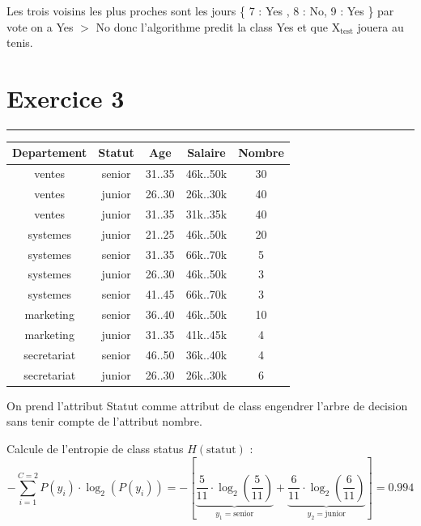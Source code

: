 \documentclass{article}
\newcommand{\exer}[1]{
  \section*{Exercice #1}
  \vspace{-0.5cm}
  \noindent\rule{\textwidth}{0.5pt}%
}
\begin{document}
Les trois voisins les plus proches sont les jours  \{ 7 : Yes , 8 : No, 9 : Yes \} par vote 
on a Yes $>$ No donc l'algorithme predit la class Yes et que X$_{\text{test}}$ jouera au tenis.


\newpage

\exer{3}

\vspace{0.25cm}

\begin{table}[h]
\centering

\renewcommand{\arraystretch}{1.75} 
\setlength{\tabcolsep}{12pt}      

\begin{tabular}{|c|c|c|c|c|} 

\hline

Departement & Statut & Age & Salaire & Nombre \\ \hline
ventes & senior & 31..35 & 46k..50k  & 30\\ \hline
ventes & junior & 26..30 & 26k..30k & 40 \\ \hline
ventes & junior & 31..35 & 31k..35k & 40 \\ \hline
systemes & junior & 21..25 & 46k..50k & 20 \\ \hline
systemes & senior & 31..35 & 66k..70k  & 5\\ \hline
systemes & junior & 26..30 & 46k..50k & 3 \\ \hline
systemes & senior & 41..45 & 66k..70k  & 3\\ \hline
marketing & senior & 36..40 & 46k..50k  & 10\\ \hline
marketing & junior & 31..35 & 41k..45k  & 4\\ \hline
secretariat & senior & 46..50 & 36k..40k  & 4\\ \hline
secretariat & junior & 26..30 & 26k..30k  & 6\\ \hline
\end{tabular}
\end{table}
On prend l'attribut Statut comme attribut de class engendrer l'arbre de decision sans tenir compte de l'attribut nombre.

\vspace{0.45cm}
Calcule de l'entropie de class status $H(\text{statut})$ :
\[ - \sum_{i=1}^{C=2} P(y_i) \cdot \log_2\left( P(y_i)\right) = - \left[\underbrace{\dfrac{5}{11} \cdot \log_2\left(\dfrac{5}{11}\right)}_{y_1 = \text{senior}} + \underbrace{\dfrac{6}{11} \cdot \log_2\left(\dfrac{6}{11}\right)}_{y_2  = \text{junior}}\right]  = 0.994\]
\end{document}
